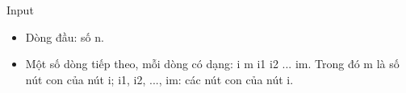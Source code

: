 Input
\begin{itemize}
	\item Dòng đầu: số n.
	\item Một số dòng tiếp theo, mỗi dòng có dạng: i m i1 i2 ... im. Trong đó m là số nút con của nút i; i1, i2, ..., im: các nút con của nút i.
\end{itemize}